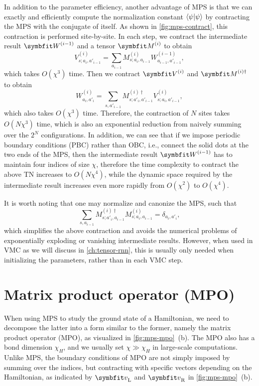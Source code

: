 In addition to the parameter efficiency, another advantage of MPS is that we can exactly and efficiently compute the normalization constant $\ip{\psi}$ by contracting the MPS with the conjugate of itself. As shown in \cref{fig:mps-contract}, this contraction is performed site-by-site. In each step, we contract the intermediate result $\mW^{(i - 1)}$ and a tensor $\mM^{(i)}$ to obtain
\begin{equation}
V^{(i)}_{s; a_i, a'_{i - 1}} = \sum_{a_{i - 1}} M^{(i)}_{s; a_i, a_{i - 1}} W^{(i - 1)}_{a_{i - 1}, a'_{i - 1}},
\end{equation}
which takes $O(\chi^3)$ time. Then we contract $\mV^{(i)}$ and $\mM^{(i) \dagger}$ to obtain
\begin{equation}
W^{(i)}_{a_i, a'_i} = \sum_{s, a'_{i - 1}} M^{(i) \dagger}_{s; a'_i, a'_{i - 1}} V^{(i)}_{s; a_i, a'_{i - 1}},
\end{equation}
which also takes $O(\chi^3)$ time. Therefore, the contraction of $N$ sites takes $O(N \chi^3)$ time, which is also an exponential reduction from naively summing over the $2^N$ configurations. In addition, we can see that if we impose periodic boundary conditions (PBC) rather than OBC, i.e., connect the solid dots at the two ends of the MPS, then the intermediate result $\mW^{(i - 1)}$ has to maintain four indices of size $\chi$, therefore the time complexity to contract the above TN increases to $O(N \chi^4)$, while the dynamic space required by the intermediate result increases even more rapidly from $O(\chi^2)$ to $O(\chi^4)$.

It is worth noting that one may normalize and canonize the MPS, such that
\begin{equation}
\sum_{s, a_{i - 1}} M^{(i) \dagger}_{s; a'_i, a_{i - 1}} M^{(i)}_{s; a_i, a_{i - 1}} = \delta_{a_i, a'_i},
\end{equation}
which simplifies the above contraction and avoids the numerical problems of exponentially exploding or vanishing intermediate results. However, when used in VMC as we will discuss in \cref{ch:tensor-rnn}, this is usually only needed when initializing the parameters, rather than in each VMC step.

\section{Matrix product operator (MPO)}
\label{sec:mpo}

When using MPS to study the ground state of a Hamiltonian, we need to decompose the latter into a form similar to the former, namely the matrix product operator (MPO), as visualized in \cref{fig:mps-mpo}~(b). The MPO also has a bond dimension $\chi_H$, and we usually set $\chi \gg \chi_H$ in large-scale computations. Unlike MPS, the boundary conditions of MPO are not simply imposed by summing over the indices, but contracting with specific vectors depending on the Hamiltonian, as indicated by $\vv_\text{L}$ and $\vv_\text{R}$ in \cref{fig:mps-mpo}~(b).

